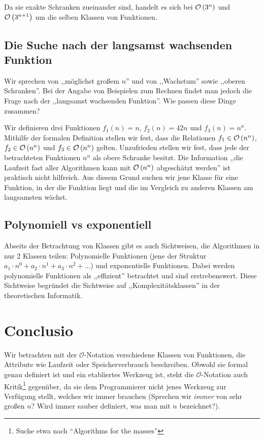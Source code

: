 Da sie exakte Schranken zueinander sind, handelt es sich bei $\mathcal{O}\left(3^n\right)$ und $\mathcal{O}\left(3^{n+1}\right)$ um die selben Klassen von Funktionen.
%
\subsection{Die Suche nach der langsamst wachsenden Funktion}
%
Wir sprechen von ,,möglichst großem $n$'' und von ,,Wachstum'' sowie ,,oberen Schranken''. Bei der Angabe von Beispielen zum Rechnen findet man jedoch die Frage nach der ,,langsamst wachsenden Funktion''. Wie passen diese Dinge zusammen?

Wir definieren drei Funktionen $f_1(n) = n$, $f_2(n) = 42n$ und $f_3(n) = n^n$. Mithilfe der formalen Definition stellen wir fest, dass die Relationen $f_1 \in \mathcal{O}\left(n^n\right)$, $f_2 \in \mathcal{O}\left(n^n\right)$ und $f_3 \in \mathcal{O}\left(n^n\right)$ gelten. Unzufrieden stellen wir fest, dass jede der betrachteten Funktionen $n^n$ als obere Schranke besitzt. Die Information ,,die Laufzeit fast aller Algorithmen kann mit $\mathcal{O}\left(n^n\right)$ abgeschätzt werden'' ist praktisch nicht hilfreich. Aus diesem Grund suchen wir jene Klasse für eine Funktion, in der die Funktion liegt und die im Vergleich zu anderen Klassen am langsamsten wächst.
%
\subsection{Polynomiell vs exponentiell}
%
Abseits der Betrachtung von Klassen gibt es auch Sichtweisen, die Algorithmen in nur 2 Klassen teilen: Polynomielle Funktionen (jene der Struktur $a_1 \cdot n^0 + a_2 \cdot n^1 + a_3 \cdot n^2 + \ldots$) und exponentielle Funktionen. Dabei werden polynomielle Funktionen als ,,effizient'' betrachtet und sind erstrebenswert. Diese Sichtweise begründet die Sichtweise auf ,,Komplexitätsklassen'' in der theoretischen Informatik.
%
\section{Conclusio}
%
Wir betrachten mit der $\mathcal{O}$-Notation verschiedene Klassen von Funktionen, die Attribute wie Laufzeit oder Speicherverbrauch beschreiben. Obwohl sie formal genau definiert ist und ein etabliertes Werkzeug ist, steht die $\mathcal{O}$-Notation auch Kritik\footnote{Suche etwa nach ``Algorithms for the masses''} gegenüber, da sie dem Programmierer nicht jenes Werkzeug zur Verfügung stellt, welches wir immer brauchen (Sprechen wir \emph{immer} von sehr großen $n$? Wird immer sauber definiert, was man mit $n$ bezeichnet?).

